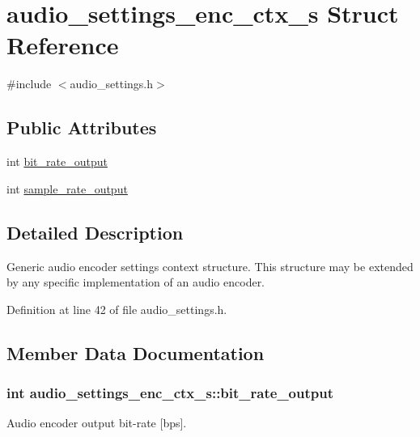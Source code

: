 \hypertarget{structaudio__settings__enc__ctx__s}{}\section{audio\+\_\+settings\+\_\+enc\+\_\+ctx\+\_\+s Struct Reference}
\label{structaudio__settings__enc__ctx__s}


{\ttfamily \#include $<$audio\+\_\+settings.\+h$>$}

\subsection*{Public Attributes}
\begin{DoxyCompactItemize}
\item 
int \hyperlink{structaudio__settings__enc__ctx__s_a760e2d60547dcb00c9e457be6ac2c66a}{bit\+\_\+rate\+\_\+output}
\item 
int \hyperlink{structaudio__settings__enc__ctx__s_a1b0355d6fd3d67a9a5a623a984b0c56a}{sample\+\_\+rate\+\_\+output}
\end{DoxyCompactItemize}


\subsection{Detailed Description}
Generic audio encoder settings context structure. This structure may be extended by any specific implementation of an audio encoder. 

Definition at line 42 of file audio\+\_\+settings.\+h.



\subsection{Member Data Documentation}
\subsubsection[{\texorpdfstring{bit\+\_\+rate\+\_\+output}{bit_rate_output}}]{\setlength{\rightskip}{0pt plus 5cm}int audio\+\_\+settings\+\_\+enc\+\_\+ctx\+\_\+s\+::bit\+\_\+rate\+\_\+output}\hypertarget{structaudio__settings__enc__ctx__s_a760e2d60547dcb00c9e457be6ac2c66a}{}\label{structaudio__settings__enc__ctx__s_a760e2d60547dcb00c9e457be6ac2c66a}
Audio encoder output bit-\/rate \mbox{[}bps\mbox{]}. 

